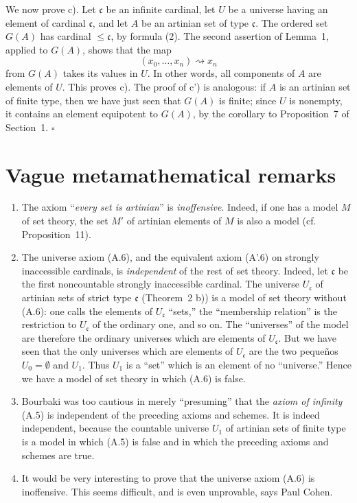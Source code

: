 \documentclass[11pt]{article}
\newcommand{\cf}{cf.}
\newcommand{\qedtext}{\hfill\(\square\)}
\begin{document}
We now prove c). Let \(\mathfrak c\) be an infinite cardinal, let \(U\) be a universe having an element of cardinal \(\mathfrak c\), and let \(A\) be an artinian set of type \(\mathfrak c\). The ordered set \(G(A)\) has cardinal \(\leq\mathfrak c\), by formula (2). The second assertion of Lemma~1, applied to \(G(A)\), shows that the map
\[
 (x_0,\ldots,x_n)\rightsquigarrow x_n
\]
from \(G(A)\) takes its values in \(U\). In other words, all components of \(A\) are elements of \(U\). This proves c). The proof of c') is analogous: if \(A\) is an artinian set of finite type, then we have just seen that \(G(A)\) is finite; since \(U\) is nonempty, it contains an element equipotent to \(G(A)\), by the corollary to Proposition~7 of Section~1. \qedtext

\section{Vague metamathematical remarks}

\begin{enumerate}[label=\alph*)]
\item The axiom ``\emph{every set is artinian}'' is \emph{inoffensive}. Indeed, if one has a model \(M\) of set theory, the set \(M'\) of artinian elements of \(M\) is also a model (\cf{} Proposition~11).

\item The universe axiom (A.6), and the equivalent axiom (A'.6) on strongly inaccessible cardinals, is \emph{independent} of the rest of set theory. Indeed, let \(\mathfrak c\) be the first noncountable strongly inaccessible cardinal. The universe \(U_{\mathfrak c}\) of artinian sets of strict type \(\mathfrak c\) (Theorem~2 b)) is a model of set theory without (A.6): one calls the elements of \(U_{\mathfrak c}\) ``sets,'' the ``membership relation'' is the restriction to \(U_{\mathfrak c}\) of the ordinary one, and so on. The ``universes'' of the model are therefore the ordinary universes which are elements of \(U_{\mathfrak c}\). But we have seen that the only universes which are elements of \(U_{\mathfrak c}\) are the two peque\~nos \(U_0=\emptyset\) and \(U_1\). Thus \(U_1\) is a ``set'' which is an element of no ``universe.'' Hence we have a model of set theory in which (A.6) is false.

\item Bourbaki was too cautious in merely ``presuming'' that the \emph{axiom of infinity} (A.5) is independent of the preceding axioms and schemes. It is indeed independent, because the countable universe \(U_1\) of artinian sets of finite type is a model in which (A.5) is false and in which the preceding axioms and schemes are true.

\item It would be very interesting to prove that the universe axiom (A.6) is inoffensive. This seems difficult, and is even unprovable, says Paul Cohen.
\end{enumerate}
\end{document}
